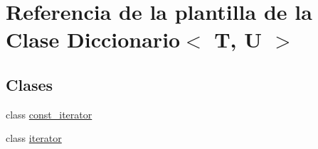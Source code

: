 \hypertarget{classDiccionario}{}\section{Referencia de la plantilla de la Clase Diccionario$<$ T, U $>$}
\label{classDiccionario}
\subsection*{Clases}
\begin{DoxyCompactItemize}
\item 
class \hyperlink{classDiccionario_1_1const__iterator}{const\+\_\+iterator}
\item 
class \hyperlink{classDiccionario_1_1iterator}{iterator}
\end{DoxyCompactItemize}
